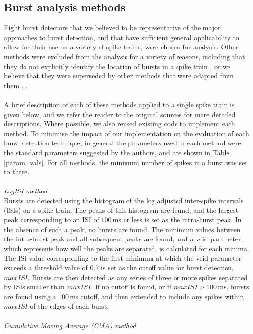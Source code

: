 \documentclass[12pt, titlepage]{article}
\begin{document}
\subsection*{Burst analysis methods}
Eight burst detectors that we believed to be representative of the major approaches to burst detection, and that have sufficient general applicability to allow for their use on a variety of spike trains, were chosen for analysis. Other methods were excluded from the analysis for a variety of reasons, including that they do not explicitly identify the location of bursts in a spike train \cite{VanElburg2004}, or we believe that they were superseded by other methods that were adapted from them \cite{Selinger2007}, \cite{Chiappalone2005}.  
\\ \\ A brief description of each of these methods applied to a single spike train is given below, and we refer the reader to the original sources for more detailed descriptions. Where possible, we also reused existing code to implement each method. To minimise the impact of our implementation on the evaluation of each burst detection technique, in general the parameters used in each method were the standard parameters suggested by the authors, and are shown in Table \ref{param_vals}.  For all methods, the minimum number of spikes in a burst was set to three. 
\\ \\ \textit{LogISI method \cite{Pasquale2010}} 
\\Bursts are detected using the histogram of the log adjusted inter-spike intervals (ISIs) on a spike train. The peaks of this histogram are found, and the largest peak corresponding to an ISI of $100\,$ms or less is set as the intra-burst peak. In the absence of such a peak, no bursts are found. The minimum values between the intra-burst peak and all subsequent peaks are found, and a void parameter, which represents how well the peaks are separated, is calculated for each minima. The ISI value corresponding to the first minimum at which the void parameter exceeds a threshold value of 0.7 is set as the cutoff value for burst detection, $maxISI$.  Bursts are then detected as any series of three or more spikes separated by ISIs smaller than $maxISI$. If no cutoff is found, or if $maxISI>100\,$ms, bursts are found using a $100\,$ms cutoff, and then extended to include any spikes within $maxISI$ of the edges of each burst.
\\ \\ \textit{Cumulative Moving Average (CMA) method \cite{Kapucu2012}} 
\end{document}
